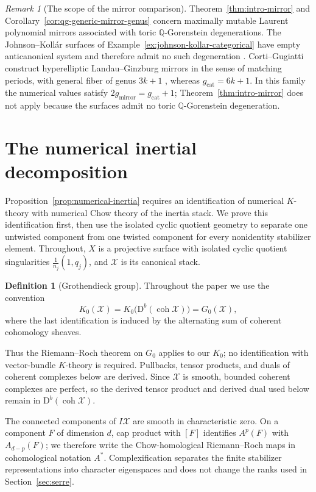 \documentclass[11pt]{article}
\theoremstyle{plain}
\theoremstyle{definition}
\newtheorem{definition}[theorem]{Definition}
\theoremstyle{remark}
\newtheorem{remark}[theorem]{Remark}
\newcommand{\cX}{\mathcal X}
\newcommand{\Db}{\mathrm D^b}
\newcommand{\coh}{\operatorname{coh}}
\newcommand{\Q}{\mathbb Q}
\newcommand{\1}{\mathbf 1}
\begin{document}
\begin{remark}[The scope of the mirror comparison]\label{rem:johnson-kollar-mirror}
Theorem~\ref{thm:intro-mirror} and Corollary~\ref{cor:qg-generic-mirror-genus} concern maximally mutable Laurent polynomial mirrors associated with toric $\Q$-Gorenstein degenerations.  The Johnson--Koll\'ar surfaces of Example~\ref{ex:johnson-kollar-categorical} have empty anticanonical system and therefore admit no such degeneration \cite[Section 1.1]{GR}.  Corti--Gugiatti construct hyperelliptic Landau--Ginzburg mirrors in the sense of matching periods, with general fiber of genus $3k+1$ \cite[Remarks 1.4 and 1.7 and Theorem 1.5]{CG}, whereas $g_{\mathrm{cat}}=6k+1$.  In this family the numerical values satisfy $2g_{\mathrm{mirror}}=g_{\mathrm{cat}}+1$; Theorem~\ref{thm:intro-mirror} does not apply because the surfaces admit no toric $\Q$-Gorenstein degeneration.
\end{remark}

\appendix
\section{The numerical inertial decomposition}\label{app:numerical-inertia}

Proposition~\ref{prop:numerical-inertia} requires an identification of numerical $K$-theory with numerical Chow theory of the inertia stack.  We prove this identification first, then use the isolated cyclic quotient geometry to separate one untwisted component from one twisted component for every nonidentity stabilizer element.  Throughout, $X$ is a projective surface with isolated cyclic quotient singularities $\frac1{n_j}(1,q_j)$, and $\cX$ is its canonical stack.

\begin{definition}[Grothendieck group]
Throughout the paper we use the convention
\[
K_0(\cX)=K_0\bigl(\Db(\coh\cX)\bigr)=G_0(\cX),
\]
where the last identification is induced by the alternating sum of coherent cohomology sheaves.
\end{definition}

Thus the Riemann--Roch theorem on $G_0$ applies to our $K_0$; no identification with vector-bundle $K$-theory is required.  Pullbacks, tensor products, and duals of coherent complexes below are derived.  Since $\cX$ is smooth, bounded coherent complexes are perfect, so the derived tensor product and derived dual used below remain in $\Db(\coh\cX)$.

The connected components of $I\cX$ are smooth in characteristic zero.  On a component $F$ of dimension $d$, cap product with $[F]$ identifies $A^p(F)$ with $A_{d-p}(F)$; we therefore write the Chow-homological Riemann--Roch maps in cohomological notation $A^*$.  Complexification separates the finite stabilizer representations into character eigenspaces and does not change the ranks used in Section~\ref{sec:serre}.
\end{document}
